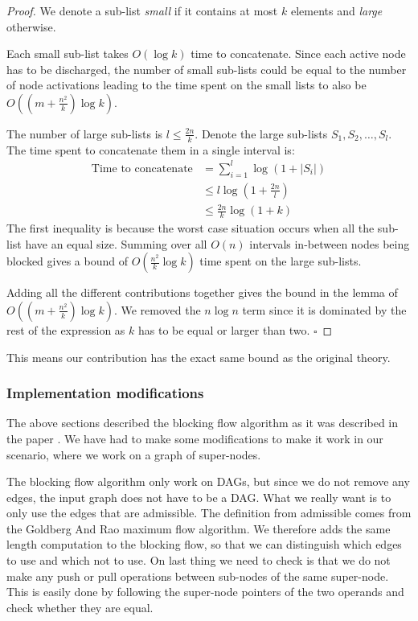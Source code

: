 \begin{proof}
	We denote a sub-list \emph{small} if it contains at most $k$ elements and \emph{large} otherwise. 
	
	Each small sub-list takes $O(\log{k})$ time to concatenate. Since each active node has to be discharged, the number of small sub-lists could
	be equal to the number of node activations leading to the time spent on the small lists to also be $O((m+\frac{n^2}{k})\log{k})$.
	
	The number of large sub-lists is $l \leq \frac{2n}{k}$. Denote the large sub-lists $S_1,S_2,\dots,S_l$. The time spent to concatenate
	them in a single interval is:
\begin{align*}
	\text{Time to concatenate} & = \sum_{i=1}^{l}{\log{(1+|S_i|)}}\\
	& \leq l \log{(1 + \frac{2n}{l})} \\
	& \leq \frac{2n}{k} \log{(1 + k)}
\end{align*}
	The first inequality is because the worst case situation occurs when all the sub-list have an equal size.
	Summing over all $O(n)$ intervals in-between nodes being blocked gives a bound of $O(\frac{n^2}{k}\log{k})$ time
	spent on the large sub-lists.
	
	Adding all the different contributions together gives the bound in the lemma of $O((m+\frac{n^2}{k})\log{k})$. 
	We removed the $n\log{n}$ term since it is dominated by the rest of the expression as $k$ has to be equal or larger than two. $\square$
\end{proof}
	
This means our contribution has the exact same bound as the original theory. 

\subsubsection{Implementation modifications}\label{BF90-ImplementationModifications}
The above sections described the blocking flow algorithm as it was described in the paper \cite{GoldbergTarjan1990}. 
We have had to make some modifications to make it work in our scenario, where we work on a graph of super-nodes.

The blocking flow algorithm only work on DAGs, but since we do not remove any edges, the input graph does not have to be a DAG.
What we really want is to only use the edges that are admissible. The definition from admissible comes from the Goldberg And Rao maximum flow algorithm.
We therefore adds the same length computation to the blocking flow, so that we can distinguish which edges to use and which not to use.
On last thing we need to check is that we do not make any push or pull operations between sub-nodes of the same super-node. This is
easily done by following the super-node pointers of the two operands and check whether they are equal.

